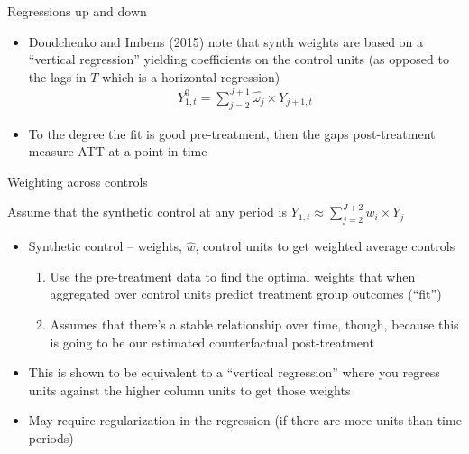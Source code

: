 \documentclass{beamer}
\begin{document}
\begin{frame}{Regressions up and down}

\begin{itemize}
\item Doudchenko and Imbens (2015) note that synth weights are based on a ``vertical regression'' yielding coefficients on the control units (as opposed to the lags in $T$ which is a horizontal regression)
\begin{eqnarray*}
Y^0_{1,t} = \sum_{j=2}^{J+1} \widehat{\omega_j} \times Y_{j+1,t}
\end{eqnarray*}
\item To the degree the fit is good pre-treatment, then the gaps post-treatment measure ATT at a point in time

\end{itemize}

\end{frame}


\begin{frame}{Weighting across controls}

Assume that the synthetic control at any period is $Y_{1,t} \approx \sum_{j=2}^{J+2} w_i \times Y_{j}$
\begin{itemize}
\item Synthetic control -- weights, $\widehat{w}$, control units to get weighted average controls
	\begin{enumerate}
	\item Use the pre-treatment data to find the optimal weights that when aggregated over control units predict treatment group outcomes (``fit'')
	\item Assumes that there's a stable relationship over time, though, because this is going to be our estimated counterfactual post-treatment
	\end{enumerate}
\item This is shown to be equivalent to a ``vertical regression'' where you regress units against the higher column units to get those weights
\item May require regularization in the regression (if there are more units than time periods)
\end{itemize}

\end{frame}
\end{document}
